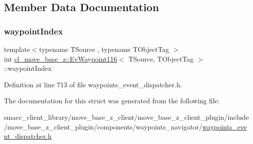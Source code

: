\subsection{Member Data Documentation}
\mbox{\label{structcl__move__base__z_1_1EvWaypoint116_ac07e740bd30a8760d40622729217193e}} 
\subsubsection{\texorpdfstring{waypoint\+Index}{waypointIndex}}
{\footnotesize\ttfamily template$<$typename T\+Source , typename T\+Object\+Tag $>$ \\
int \hyperlink{structcl__move__base__z_1_1EvWaypoint116}{cl\+\_\+move\+\_\+base\+\_\+z\+::\+Ev\+Waypoint116}$<$ T\+Source, T\+Object\+Tag $>$\+::waypoint\+Index}



Definition at line 713 of file waypoints\+\_\+event\+\_\+dispatcher.\+h.



The documentation for this struct was generated from the following file\+:\begin{DoxyCompactItemize}
\item 
smacc\+\_\+client\+\_\+library/move\+\_\+base\+\_\+z\+\_\+client/move\+\_\+base\+\_\+z\+\_\+client\+\_\+plugin/include/move\+\_\+base\+\_\+z\+\_\+client\+\_\+plugin/components/waypoints\+\_\+navigator/\hyperlink{waypoints__event__dispatcher_8h}{waypoints\+\_\+event\+\_\+dispatcher.\+h}\end{DoxyCompactItemize}
